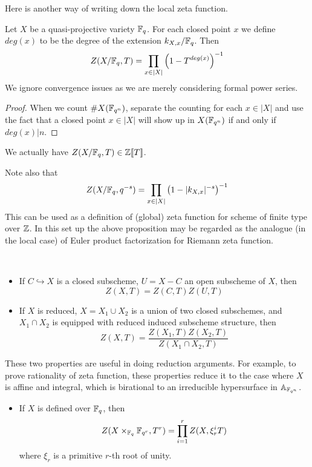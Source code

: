\documentclass[letterpaper,11pt]{article}
\begin{document}
Here is another way of writing down the local zeta function.
\begin{prop}
Let $X$ be a quasi-projective variety $\mathbb{F}_q$. For each closed point $x$ we define $deg(x)$ to be the degree of the extension $k_{X,x}/\mathbb{F}_q$. Then
\[
Z(X/\mathbb{F}_q, T) = \prod_{x \in |X|} \left(1 - T^{deg(x)}\right)^{-1}
\]
We ignore convergence issues as we are merely considering formal power series.
\end{prop}
\begin{proof}
When we count $\#X(\mathbb{F}_{q^n})$, separate the counting for each $x \in |X|$ and use the fact that a closed point $x \in |X|$ will show up in $X(\mathbb{F}_{q^n})$ if and only if $deg(x) | n$.
\end{proof}
\begin{cor}
We actually have $Z(X/\mathbb{F}_q, T) \in \mathbb{Z}[\![T]\!]$.
\end{cor}
\begin{rem}
Note also that 
\[
Z(X/\mathbb{F}_q, q^{-s}) = \prod_{x \in |X|} \left(1 - |k_{X,x}|^{-s}\right)^{-1}
\]
This can be used as a definition of (global) zeta function for scheme of finite type over $\mathbb{Z}$. In this set up the above proposition may be regarded as the analogue (in the local case) of Euler product factorization for Riemann zeta function.
\end{rem}
\begin{prop} \hspace{1mm} \\
\begin{itemize}
    \item If $C \hookrightarrow X$ is a closed subscheme, $U = X - C$ an open subscheme of $X$, then 
    \[
    Z(X,T) = Z(C,T)Z(U,T)
    \]
    \item If $X$ is reduced, $X = X_1 \cup X_2$ is a union of two closed subschemes, and $X_1 \cap X_2$ is equipped with reduced induced subscheme structure, then
    \[
    Z(X,T) = \frac{Z(X_1,T)Z(X_2,T)}{Z(X_1 \cap X_2,T)}
    \]
\end{itemize}
These two properties are useful in doing reduction arguments. For example, to prove rationality of zeta function, these properties reduce it to the case where $X$ is affine and integral, which is birational to an irreducible hypersurface in $\mathbb{A}_{\mathbb{F}_{q^n}}$.
\begin{itemize}[resume]
    \item If $X$ is defined over $\mathbb{F}_q$, then
    \[
    Z(X \times_{\mathbb{F}_q} \mathbb{F}_{q^r}, T^r) = \prod_{i=1}^r Z(X, \xi_r^i T)
    \]
    where $\xi_r$ is a primitive $r$-th root of unity.
\end{itemize}
\end{prop}
\end{document}
